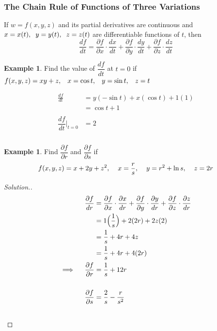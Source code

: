 \documentclass[11pt,a4paper]{article}
\theoremstyle{definition}
\newtheorem{exa}[thm]{Example}
\newenvironment{solution}
  {\renewcommand{\qedsymbol}{}\begin{proof}[\textit{Solution}.]}
  {\end{proof}}
\begin{document}
\subsubsection{The Chain Rule of Functions of Three Variations}
If $w = f(x,y,z)$ and its partial derivatives are continuous and $x = x(t), \hspace{0.2cm} y = y(t), \hspace{0.2cm} z = z(t)$ are differentiable functions of $t$, then 
$$\dfrac{d f}{d t} = \frac{\partial f}{\partial x}\cdot \frac{dx}{dt} + \frac{\partial f}{\partial y}\cdot \frac{dy}{dt} + \frac{\partial f}{\partial z}\cdot \frac{dz}{dt}$$


\begin{exa}


Find the value of $\dfrac{df}{dt}$ at $t = 0$ if $f(x,y,z) = xy + z, \hspace{0.3cm} x = \cos t, \hspace{0.3cm} y = \sin t, \hspace{0.3cm} z = t$


\begin{align*}
\frac{d f}{d t} & = y (-\sin t) + x(\cos t) + 1(1)\\
& = \cos t + 1\\\\
\dfrac{d f}{d t}\Bigg|_{t = 0} & = 2\\\\
\end{align*}
\end{exa}

\begin{exa}


Find $\dfrac{\partial f}{\partial r}$ and $\dfrac{\partial f}{\partial s}$ if $$f(x,y,z) = x + 2y + z^2, \hspace{0.4cm} x = \dfrac{r}{s},\hspace{0.4cm} y = r^2 + \ln s, \hspace{0.4cm} z = 2r$$
\end{exa}


\begin{solution}
\begin{align*}
\dfrac{\partial f}{d r} & = \frac{\partial f}{\partial x}\cdot \frac{\partial x}{dr} + \frac{\partial f}{\partial y}\cdot \frac{\partial y}{dr} + \frac{\partial f}{\partial z}\cdot \frac{\partial z}{dr}\\
&  = 1\Big(\dfrac{1}{s}\Big) + 2(2r) + 2z(2)\\
& = \dfrac{1}{s} + 4r + 4z\\
&  = \dfrac{1}{s} + 4r + 4(2r)\\
\implies \hspace{0.4cm} \dfrac{\partial f}{\partial r} & = \dfrac{1}{s} + 12r\\\\
\dfrac{\partial f}{\partial s} & = \dfrac{2}{s} - \dfrac{r}{s^2}\\\\
\end{align*}
\end{solution}
\end{document}
